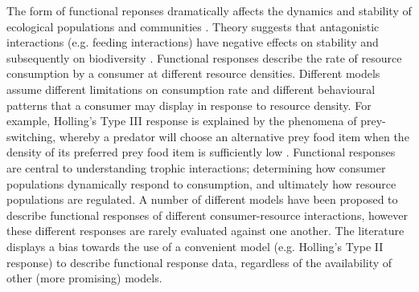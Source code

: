 \documentclass[11pt]{article}
\begin{document}
        The form of functional reponses dramatically affects the dynamics and stability of ecological populations and communities \citep{hastings2013population}. Theory suggests that antagonistic interactions (e.g. feeding interactions) have negative effects on stability and subsequently on biodiversity \citep{rosenbaum2018fitting}. Functional responses describe the rate of resource consumption by a consumer at different resource densities. Different models assume different limitations on consumption rate and different behavioural patterns that a consumer may display in response to resource density. For example, Holling's Type III response is explained by the phenomena of prey-switching, whereby a predator will choose an alternative prey food item when the density of its preferred prey food item is sufficiently low \citep{akre1979switching,oaten1975functional,elliott2004prey}. Functional responses are central to understanding trophic interactions; determining how consumer populations dynamically respond to consumption, and ultimately how resource populations are regulated. A number of different models have been proposed to describe functional responses of different consumer-resource interactions, however these different responses are rarely evaluated against one another. The literature displays a bias towards the use of a convenient model (e.g. Holling's Type II response) to describe functional response data, regardless of the availability of other (more promising) models.
            
\end{document}
